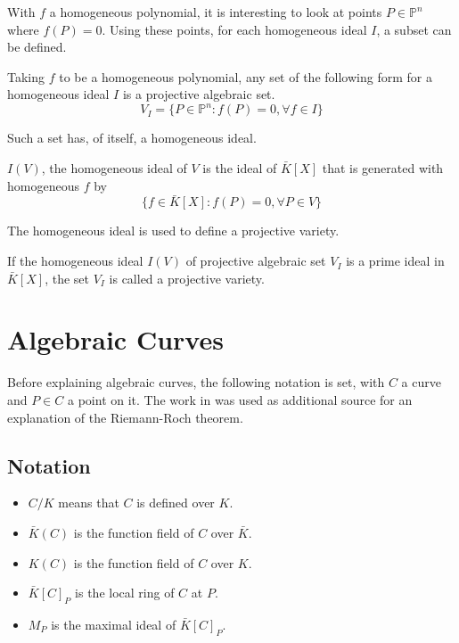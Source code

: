 With $f$ a homogeneous polynomial, it is interesting to look at points $P\in\mathbb{P}^n$ where $f(P)=0$. Using these points, for each homogeneous ideal $I$, a subset can be defined.
\begin{defn}
	Taking $f$ to be a homogeneous polynomial, any set of the following form for a homogeneous ideal $I$ is a projective algebraic set.
	\begin{equation*}
	V_I=\{P\in\mathbb{P}^n:f(P)=0,\forall f\in I\}
	\end{equation*}
\end{defn}

Such a set has, of itself, a homogeneous ideal.
\begin{defn}
	$I(V)$, the homogeneous ideal of $V$ is the ideal of $\bar{K}[X]$ that is generated with homogeneous $f$ by
	\begin{equation*}
	\{f\in\bar{K}[X]:f(P)=0,\forall P\in V\}
	\end{equation*}
\end{defn}

The homogeneous ideal is used to define a projective variety.
\begin{defn}
	If the homogeneous ideal $I(V)$ of projective algebraic set $V_I$ is a prime ideal in $\bar{K}[X]$, the set $V_I$ is called a projective variety.
\end{defn}

\section{Algebraic Curves}
Before explaining algebraic curves, the following notation is set, with $C$ a curve and $P\in C$ a point on it. The work in \cite{RRBrouwer} was used as additional source for an explanation of the Riemann-Roch theorem.
\subsection{Notation}
\begin{itemize}
	\item $C/K$ means that $C$ is defined over $K$.
	\item $\bar{K}(C)$ is the function field of $C$ over $\bar{K}$.
	\item $K(C)$ is the function field of $C$ over $K$.
	\item $\bar{K}[C]_P$ is the local ring of $C$ at $P$.
	\item $M_P$ is the maximal ideal of $\bar{K}[C]_P$.
\end{itemize}
